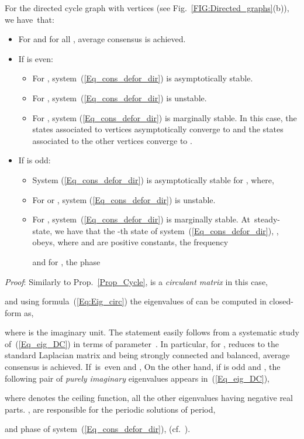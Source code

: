 \documentclass[letterpaper,9pt,twocolumn]{autart}
\begin{document}
\begin{proposition}\label{Prop_DirCyc}
For the directed cycle graph  with  vertices 
(see Fig.~\ref{FIG:Directed_graphs}(b)), we have~that:
\begin{itemize}
\item For  and for all , average consensus is achieved.
\item If  is even:
\begin{itemize}
\item For , system~(\ref{Eq_cons_defor_dir}) is asymptotically stable.
\item For , system~(\ref{Eq_cons_defor_dir}) is unstable.
\item For , system (\ref{Eq_cons_defor_dir}) is marginally stable.
In this case, the states associated to  vertices asymptotically
converge to 
and the states associated to the other  vertices converge to .
\end{itemize}
\item If  is odd:
\begin{itemize}
\item System (\ref{Eq_cons_defor_dir}) is asymptotically stable for , where,

\item For  or , system (\ref{Eq_cons_defor_dir}) is unstable.
\item For , system~(\ref{Eq_cons_defor_dir}) is marginally stable. At~steady-state,
we have that the -th state of system~(\ref{Eq_cons_defor_dir}), , obeys, 
where  and  are positive constants, the frequency

and for , the phase

\end{itemize}
\end{itemize}
\emph{Proof}:
Similarly to Prop.~\ref{Prop_Cycle}, 
is a \emph{circulant matrix} in this case,

and using formula~(\ref{Eq:Eig_circ}) the eigenvalues of 
can be computed in closed-form as,

where  is the imaginary unit. The statement easily follows from a systematic
study of~(\ref{Eq_eig_DC}) in terms of parameter~. In particular, for ,
 reduces to the standard 
Laplacian matrix and being  strongly connected and balanced,
average consensus is achieved. \mbox{If  is even} and , 
On the other hand, if  is odd and , the following
pair of \emph{purely imaginary} eigenvalues appears in~(\ref{Eq_eig_DC}),

where  denotes the ceiling function, all the
other eigenvalues having negative real parts.
,  are responsible for the periodic solutions of period,

and phase  of system~(\ref{Eq_cons_defor_dir}), (cf.~\cite[p.~134]{Strogatz_book94}).
\hfill
\end{proposition}
\end{document}
